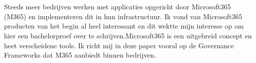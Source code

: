 
\chapter*{}%
\label{ch:voorwoord}


Steeds meer bedrijven werken met applicaties opgericht door Microsoft365 (M365) en implementeren dit in hun infrastructuur. Ik vond van Microsoft365 producten van het begin al heel interessant en dit wektte mijn interesse op om hier een bachelorproef over te schrijven.Microsoft365 is een uitgebreid concept en heet verscheidene tools. Ik richt mij in deze paper vooral op de Governance Frameworks dat M365 aanbiedt binnen bedrijven.

